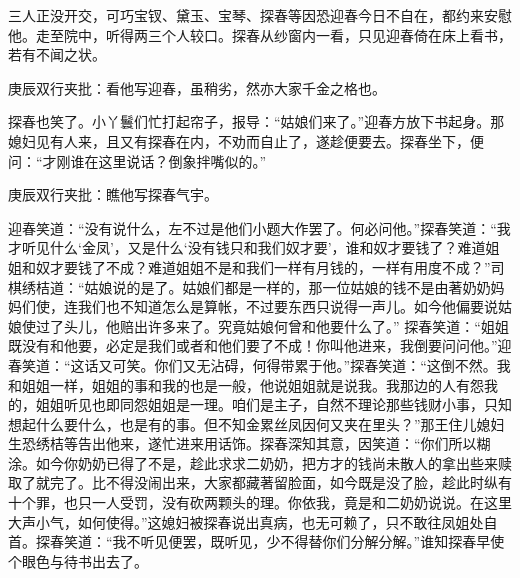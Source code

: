 \begin{parag}


    三人正没开交，可巧宝钗、黛玉、宝琴、探春等因恐迎春今日不自在，都约来安慰他。走至院中，听得两三个人较口。探春从纱窗内一看，只见迎春倚在床上看书，若有不闻之状。\begin{note}庚辰双行夹批：看他写迎春，虽稍劣，然亦大家千金之格也。\end{note}探春也笑了。小丫鬟们忙打起帘子，报导：“姑娘们来了。”迎春方放下书起身。那媳妇见有人来，且又有探春在内，不劝而自止了，遂趁便要去。探春坐下，便问：“才刚谁在这里说话？倒象拌嘴似的。”\begin{note}庚辰双行夹批：瞧他写探春气宇。\end{note}迎春笑道：“没有说什么，左不过是他们小题大作罢了。何必问他。”探春笑道：“我才听见什么‘金凤’，又是什么‘没有钱只和我们奴才要’，谁和奴才要钱了？难道姐姐和奴才要钱了不成？难道姐姐不是和我们一样有月钱的，一样有用度不成？”司棋绣桔道：“姑娘说的是了。姑娘们都是一样的，那一位姑娘的钱不是由著奶奶妈妈们使，连我们也不知道怎么是算帐，不过要东西只说得一声儿。如今他偏要说姑娘使过了头儿，他赔出许多来了。究竟姑娘何曾和他要什么了。” 探春笑道：“姐姐既没有和他要，必定是我们或者和他们要了不成！你叫他进来，我倒要问问他。”迎春笑道：“这话又可笑。你们又无沾碍，何得带累于他。”探春笑道：“这倒不然。我和姐姐一样，姐姐的事和我的也是一般，他说姐姐就是说我。我那边的人有怨我的，姐姐听见也即同怨姐姐是一理。咱们是主子，自然不理论那些钱财小事，只知想起什么要什么，也是有的事。但不知金累丝凤因何又夹在里头？”那王住儿媳妇生恐绣桔等告出他来，遂忙进来用话饰。探春深知其意，因笑道：“你们所以糊涂。如今你奶奶已得了不是，趁此求求二奶奶，把方才的钱尚未散人的拿出些来赎取了就完了。比不得没闹出来，大家都藏著留脸面，如今既是没了脸，趁此时纵有十个罪，也只一人受罚，没有砍两颗头的理。你依我，竟是和二奶奶说说。在这里大声小气，如何使得。”这媳妇被探春说出真病，也无可赖了，只不敢往凤姐处自首。探春笑道：“我不听见便罢，既听见，少不得替你们分解分解。”谁知探春早使个眼色与待书出去了。
\end{parag}


